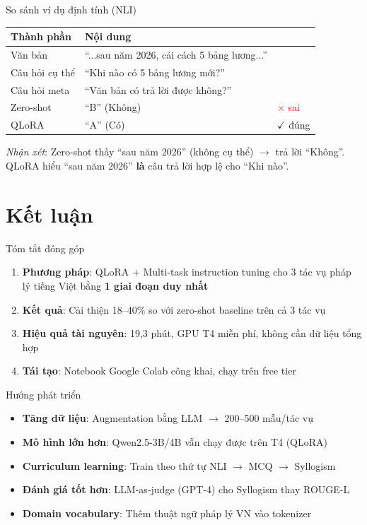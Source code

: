 \documentclass{beamer}
\begin{document}
\begin{frame}{So sánh ví dụ định tính (NLI)}
  \begin{table}
    \small
    \begin{tabular}{lll}
      \toprule
      \textbf{Thành phần} & \textbf{Nội dung} & \textbf{} \\
      \midrule
      Văn bản & ``...sau năm 2026, cải cách 5 bảng lương...'' & \\
      Câu hỏi cụ thể & ``Khi nào có 5 bảng lương mới?'' & \\
      Câu hỏi meta & ``Văn bản có trả lời được không?'' & \\
      \midrule
      Zero-shot & ``B'' (Không) & \textcolor{red}{$\times$ sai} \\
      QLoRA & ``A'' (Có) & \textcolor{green!50!black}{$\checkmark$ đúng} \\
      \bottomrule
    \end{tabular}
  \end{table}
  \vspace{0.3cm}
  \textit{Nhận xét}: Zero-shot thấy ``sau năm 2026'' (không cụ thể) $\to$ trả lời ``Không''.
  QLoRA hiểu ``sau năm 2026'' \textbf{là} câu trả lời hợp lệ cho ``Khi nào''.
\end{frame}

\section{Kết luận}

\begin{frame}{Tóm tắt đóng góp}
  \begin{enumerate}
    \item \textbf{Phương pháp}: QLoRA + Multi-task instruction tuning cho 3 tác vụ pháp lý
      tiếng Việt bằng \textbf{1 giai đoạn duy nhất}
    \item \textbf{Kết quả}: Cải thiện 18--40\% so với zero-shot baseline trên cả 3 tác vụ
    \item \textbf{Hiệu quả tài nguyên}: 19,3 phút, GPU T4 miễn phí, không cần dữ liệu tổng hợp
    \item \textbf{Tái tạo}: Notebook Google Colab công khai, chạy trên free tier
  \end{enumerate}
\end{frame}

\begin{frame}{Hướng phát triển}
  \begin{itemize}
    \item \textbf{Tăng dữ liệu}: Augmentation bằng LLM $\to$ 200--500 mẫu/tác vụ
    \item \textbf{Mô hình lớn hơn}: Qwen2.5-3B/4B vẫn chạy được trên T4 (QLoRA)
    \item \textbf{Curriculum learning}: Train theo thứ tự NLI $\to$ MCQ $\to$ Syllogism
    \item \textbf{Đánh giá tốt hơn}: LLM-as-judge (GPT-4) cho Syllogism thay ROUGE-L
    \item \textbf{Domain vocabulary}: Thêm thuật ngữ pháp lý VN vào tokenizer
  \end{itemize}
\end{frame}
\end{document}
